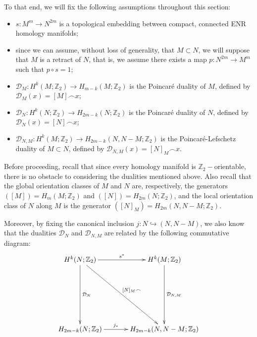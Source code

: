\documentclass[12pt,oneside]{book}
\newcommand{\Z}{\mathbb{Z}}
\newcommand{\ccap}{\frown}
\begin{document}
    To that end, we will fix the following assumptions throughout this section:

    \begin{itemize}
        \item $s:M^{m}\to N^{2m}$ is a topological embedding between compact, connected ENR homology 
        manifolds;
        \item since we can assume, without loss of generality, that $M\subset N$, we will suppose that $M$ is a retract of $N$, 
        that is, we assume there exists a map $p:N^{2m}\to M^{m}$ such that $p\circ s=1$;
        \item $\mathcal{D}_{M}:H^{k}(M;\Z_{2})\to H_{m-k}(M;\Z_{2})$ is the Poincaré duality of $M$, defined by 
        $\mathcal{D}_{M}(x)=[M]\ccap x$;
        \item $\mathcal{D}_{N}:H^{k}(N;\Z_{2})\to H_{2m-k}(N;\Z_{2})$ is the Poincaré duality of $N$, defined by 
        $\mathcal{D}_{N}(x)=[N]\ccap x$;
        \item $\mathcal{D}_{N,M}:H^{k}(M;\Z_{2})\to H_{2m-k}(N,N-M;\Z_{2})$ is the Poincaré-Lefschetz 
        duality of $M\subset N$, defined by $\mathcal{D}_{N,M}(x)=[N]_{M}\ccap x$.
    \end{itemize}

    Before proceeding, recall that since every homology manifold is $\Z_{2}-$orientable, there is no obstacle to considering the dualities 
    mentioned above. Also recall that the global orientation classes of $M$ and $N$ are, respectively, the 
    generators $([M])=H_{m}(M;\Z_{2})$ and $([N])=H_{2m}(N;\Z_{2})$, and the local orientation class of $N$ 
    along $M$ is the generator $([N]_{M})=H_{2m}(N,N-M;\Z_{2})$.

    Moreover, by fixing the canonical inclusion $j:N\hookrightarrow (N,N-M)$, we also know that the dualities $\mathcal{D}_{N}$ and 
    $\mathcal{D}_{N,M}$ are related by the following commutative diagram:
    $$ \xymatrix @C=0.5cm {
        H^{k}(N;\Z_{2}) \ar[rr]^-{s^{*}} \ar[ddd]^-{\mathcal{D}_{N}} \ar[rrddd]^-{[N]_{M}\ccap} && H^{k}(M;\Z_{2}) \ar[ddd]^-{\mathcal{D}_{N,M}} \\
        && \\
        && \\
        H_{2m-k}(N;\Z_{2}) \ar[rr]^-{j_{*}} && H_{2m-k}(N,N-M;\Z_{2})
    } $$
\end{document}
